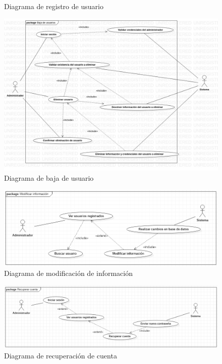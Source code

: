 \documentclass[12pt,letterpaper]{article}
\begin{document}
{\begin{figure}[H]
            \caption{Diagrama de registro de usuario}
        \end{figure}
        \begin{figure}[H]
            \centering
            \includegraphics [scale=0.3]{baja_usuarios}
            \caption{Diagrama de baja de usuario}
        \end{figure}
        \begin{figure}[H]
            \centering
            \includegraphics [scale=0.6]{modificarInformacion}
            \caption{Diagrama de modificación de información}
        \end{figure}
        \begin{figure}[H]
            \centering
            \includegraphics [scale=0.5]{recuperarCuenta}
            \caption{Diagrama de recuperación de cuenta}

\end{figure}}
\end{document}
